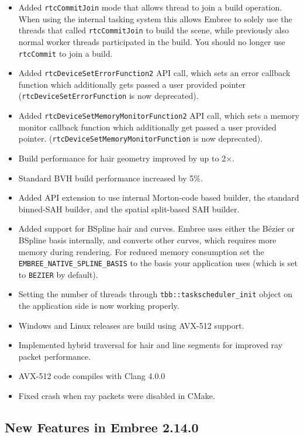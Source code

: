 \begin{itemize}
\tightlist
\item
  Added \texttt{rtcCommitJoin} mode that allows thread to join a build
  operation. When using the internal tasking system this allows Embree
  to solely use the threads that called \texttt{rtcCommitJoin} to build
  the scene, while previously also normal worker threads participated in
  the build. You should no longer use \texttt{rtcCommit} to join a
  build.
\item
  Added \texttt{rtcDeviceSetErrorFunction2} API call, which sets an
  error callback function which additionally gets passed a user provided
  pointer (\texttt{rtcDeviceSetErrorFunction} is now deprecated).
\item
  Added \texttt{rtcDeviceSetMemoryMonitorFunction2} API call, which sets
  a memory monitor callback function which additionally get passed a
  user provided pointer. (\texttt{rtcDeviceSetMemoryMonitorFunction} is
  now deprecated).
\item
  Build performance for hair geometry improved by up to 2×.
\item
  Standard BVH build performance increased by 5\%.
\item
  Added API extension to use internal Morton-code based builder, the
  standard binned-SAH builder, and the spatial split-based SAH builder.
\item
  Added support for BSpline hair and curves. Embree uses either the
  Bézier or BSpline basis internally, and converts other curves, which
  requires more memory during rendering. For reduced memory consumption
  set the \texttt{EMBREE\_NATIVE\_SPLINE\_BASIS} to the basis your
  application uses (which is set to \texttt{BEZIER} by default).
\item
  Setting the number of threads through
  \texttt{tbb::taskscheduler\_init} object on the application side is
  now working properly.
\item
  Windows and Linux releases are build using AVX-512 support.
\item
  Implemented hybrid traversal for hair and line segments for improved
  ray packet performance.
\item
  AVX-512 code compiles with Clang 4.0.0
\item
  Fixed crash when ray packets were disabled in CMake.
\end{itemize}

\subsection{New Features in Embree
2.14.0}\label{new-features-in-embree-2.14.0}

